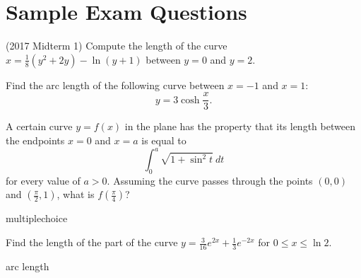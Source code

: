 \documentclass{ximera}
\begin{document}
\section*{Sample Exam Questions}

\begin{question}(2017 Midterm 1)
Compute the length of the curve $x = \frac{1}{8} (y^2 + 2y) - \ln (y+1)$ between $y=0$ and $y = 2$.
\begin{multipleChoice}
\end{multipleChoice}
\end{question}

\begin{question}
 Find the arc length of the following curve between $x=-1$ and $x=1$:
\[ y = 3 \cosh \frac{x}{3}. \]
\begin{multipleChoice}
\end{multipleChoice}
\end{question}

\begin{question}
 A certain curve $y = f(x)$ in the plane has the property that its length between the endpoints $x=0$ and $x=a$ is equal to
\[ \int_0^a \sqrt{1 + \sin^2 t} ~ dt \]
for every value of $a > 0$.  Assuming the curve passes through the points $(0,0)$ and $(\frac{\pi}{2},1)$, what is $f( \frac{\pi}{4})$?
\begin{multipleChoice} 
\end{multipleChoice}
\end{question}

\begin{question}[2015C.13]
\begin{type}
multiplechoice
\end{type}
Find the length of the part of the curve \(\displaystyle y = \frac{3}{16} e^{2x} + \frac{1}{3} e^{-2x}\) for \(0 \leq x \leq \ln 2\).
\begin{multiplechoice}
\end{multiplechoice}
\begin{keywords}
arc length
\end{keywords}
\end{question}
\end{document}
